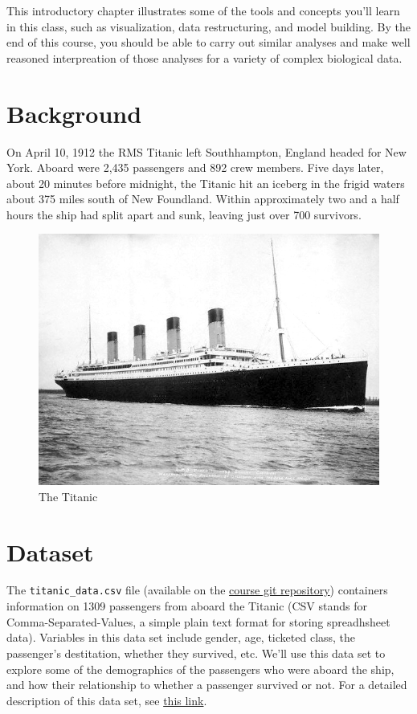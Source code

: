 \documentclass[]{book}
\theoremstyle{definition}
\theoremstyle{definition}
\theoremstyle{definition}
\theoremstyle{remark}
\begin{document}
This introductory chapter illustrates some of the tools and concepts
you'll learn in this class, such as visualization, data restructuring,
and model building. By the end of this course, you should be able to
carry out similar analyses and make well reasoned interpreation of those
analyses for a variety of complex biological data.

\hypertarget{background}{%
\section{Background}\label{background}}

On April 10, 1912 the RMS Titanic left Southhampton, England headed for
New York. Aboard were 2,435 passengers and 892 crew members. Five days
later, about 20 minutes before midnight, the Titanic hit an iceberg in
the frigid waters about 375 miles south of New Foundland. Within
approximately two and a half hours the ship had split apart and sunk,
leaving just over 700 survivors.

\begin{figure}
\centering
\includegraphics{./figures/fig-titanic.png}
\caption{The Titanic}
\end{figure}

\hypertarget{dataset}{%
\section{Dataset}\label{dataset}}

The \texttt{titanic\_data.csv} file (available on the
\href{https://github.com/bio304-class/bio304-course-notes/raw/master/datasets/titanic_data.csv}{course
git repository}) containers information on 1309 passengers from aboard
the Titanic (CSV stands for Comma-Separated-Values, a simple plain text
format for storing spreadhsheet data). Variables in this data set
include gender, age, ticketed class, the passenger's destitation,
whether they survived, etc. We'll use this data set to explore some of
the demographics of the passengers who were aboard the ship, and how
their relationship to whether a passenger survived or not. For a
detailed description of this data set, see
\href{http://biostat.mc.vanderbilt.edu/wiki/pub/Main/DataSets/titanic3info.txt}{this
link}.
\end{document}
